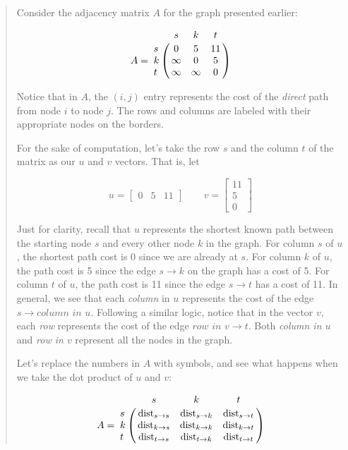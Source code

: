 \documentclass[12pt]{article}
\begin{document}
\begin{quote}
    Consider the adjacency matrix $A$ for the graph presented earlier:

    \[
        A =
        \bordermatrix{
            & s & k & t \cr
            s & 0 & 5 & 11 \cr
            k & \infty & 0 & 5 \cr
            t & \infty & \infty & 0 \cr
        }
    \]

    Notice that in $A$, the $(i, j)$ entry represents the cost of the \emph{direct} path from node $i$ to node $j$. The rows and columns are labeled with their appropriate nodes on the borders.

    For the sake of computation, let's take the row $s$ and the column $t$ of the matrix as our $u$ and $v$ vectors. That is, let

    \[
        u =
        \begin{bmatrix}
            0 & 5 & 11
        \end{bmatrix}
        \qquad
        v =
        \begin{bmatrix}
            11 \\
            5 \\
            0
        \end{bmatrix}
    \]

    Just for clarity, recall that $u$ represents the shortest known path between the starting node $s$ and every other node $k$ in the graph. For column $s$ of $u$, the shortest path cost is 0 since we are already at $s$. For column $k$ of $u$, the path cost is 5 since the edge $s \to k$ on the graph has a cost of 5. For column $t$ of $u$, the path cost is 11 since the edge $s \to t$ has a cost of 11. In general, we see that each \emph{column} in $u$ represents the cost of the edge $s \to \textit{column in u}$. Following a similar logic, notice that in the vector $v$, each \emph{row} represents the cost of the edge $\textit{row in v} \to t$. Both \textit{column in $u$} and \textit{row in $v$} represent all the nodes in the graph.

    Let's replace the numbers in $A$ with symbols, and see what happens when we take the dot product of $u$ and $v$:

    \[
        A =
        \bordermatrix{
            & s & k & t \cr
            s & \mathrm{dist}_{s \to s} & \mathrm{dist}_{s \to k} & \mathrm{dist}_{s \to t} \cr
            k & \mathrm{dist}_{k \to s} & \mathrm{dist}_{k \to k} & \mathrm{dist}_{k \to t} \cr
            t & \mathrm{dist}_{t \to s} & \mathrm{dist}_{t \to k} & \mathrm{dist}_{t \to t} \cr
        }
    \]


\end{quote}
\end{document}
